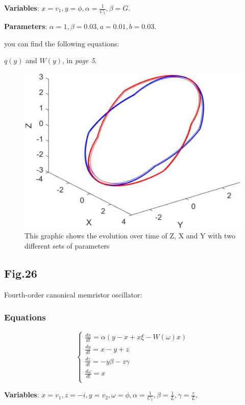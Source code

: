\documentclass[12pt, a4paper]{paper}
\begin{document}
\textbf{Variables}: $x=v_1, y=\phi, \alpha=\frac{1}{C_1},
\beta=G$.

\textbf{Parameters}: $\alpha =1, \beta =0.03, a=0.01, b=0.03$.

you can find the following equations: 

$q(y)$ and $W(y)$, in \textit{page 5}.

\begin{figure}[h]
\centering
\includegraphics[width=1\textwidth]{Fig_23.eps}
\caption{This graphic shows the evolution over time of Z, X and Y with two different sets of parameters}
\end{figure}

\newpage
\subsection{Fig.26}
Fourth-order canonical memristor oscillator:
\subsubsection{Equations}
\begin{equation}
\begin{cases}
\frac{dx}{dt}=\alpha(y-x+x\xi-W(\omega)x)
\\
\frac{dy}{dt}=x-y+z
\\
\frac{dz}{dt}=-y\beta-z\gamma
\\
\frac{d\omega}{dt}=x
\\
\end{cases}
\end{equation}

\textbf{Variables}: $x=v_1, z=-i, y=v_2, \omega=\phi, \alpha=\frac{1}{C_1},
\beta=\frac{1}{L}, \gamma=\frac{r}{L},$ 
\end{document}
